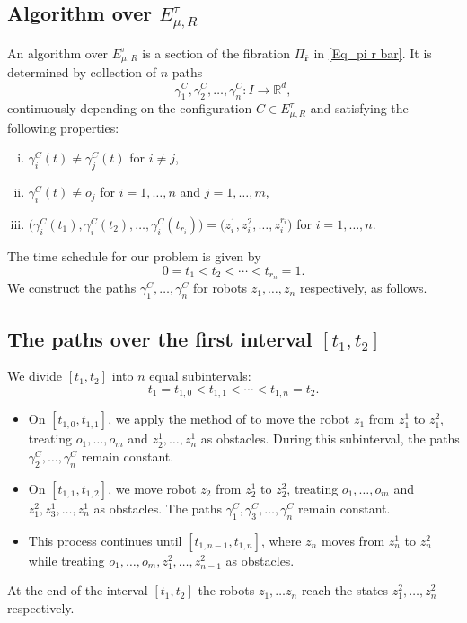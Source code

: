 \documentclass[12pt,oneside,reqno]{amsart}
\theoremstyle{plain}
\theoremstyle{definition}
\theoremstyle{remark}
\newcommand{\rr}{{\mathbb {R}}}
\begin{document}
\subsection{Algorithm over \texorpdfstring{$E_{\mu, R}^{\tau}$}:}\label{Algorithm over E u,R,tau} 
 An algorithm over $E_{\mu, R}^{\tau}$ is a section of the fibration $\Pi_{\bar{\textbf{r}}}$ in \eqref{Eq_pi r bar}. It is determined by collection of $n$ paths $$\gamma_1^C, \gamma_2^C, \ldots, \gamma_n^C : I \to \rr^d,$$
continuously depending on the configuration $C\in E_{\mu, R}^{\tau}$ and satisfying the following properties:
\begin{enumerate}[(i)]
    \item $\gamma_i^C(t)\neq \gamma_j^C(t)$ for $i\neq j$,
    \item $\gamma_i^C(t)\neq o_j$ for $i=1, \ldots, n$ and $j=1, \ldots, m$,
    \item $\big(\gamma_i^C(t_1), \gamma_i^C(t_2), \ldots, \gamma_i^C(t_{r_i})\big)= \big(z_i^1, z_i^2, \ldots, z_i^{r_i}\big)$  for $i=1, \ldots, n$.   
\end{enumerate}




\noindent  The time schedule for our problem is given by
\[
0 = t_1 < t_2 < \cdots < t_{r_n} = 1.
\]
We construct the paths $\gamma_1^C, \ldots, \gamma_n^C$ for robots 
$z_1, \ldots, z_n$ respectively, as follows.

\medskip
\noindent
\subsection*{The paths over the first interval \texorpdfstring{$[t_1, t_2]$}:}

We divide $[t_1, t_2]$ into $n$ equal subintervals:
$$t_1 = t_{1,0} < t_{1,1} < \cdots < t_{1,n} = t_2.$$
\begin{itemize}
    \item On $[t_{1,0}, t_{1,1}]$, we apply the method of \cite[Section~2]{FarP23} to move the robot $z_1$ from $z_1^1$ to $z_1^2$, treating $o_1, \ldots, o_m$ and $z_2^1, \ldots, z_n^1$ as obstacles. During this subinterval, the paths $\gamma_2^C, \ldots, \gamma_n^C$ remain constant.
    \item On $[t_{1,1}, t_{1,2}]$, we move robot $z_2$ from $z_2^1$ to $z_2^2$, treating $o_1, \ldots, o_m$ and $z_1^2, z_3^1, \ldots, z_n^1$ as obstacles. The paths $\gamma_1^C, \gamma_3^C, \ldots, \gamma_n^C$ remain constant.
    \item This process continues until $[t_{1,n-1}, t_{1,n}]$, where $z_n$ moves from $z_n^1$ to $z_n^2$ while treating $o_1, \ldots, o_m, z_1^2, \ldots, z_{n-1}^2$ as obstacles.
\end{itemize}
At the end of the interval $[t_1, t_2]$ the robots $z_1, \ldots z_n$ reach the states $z_1^2, \ldots, z_{n}^2$ respectively.
\end{document}
